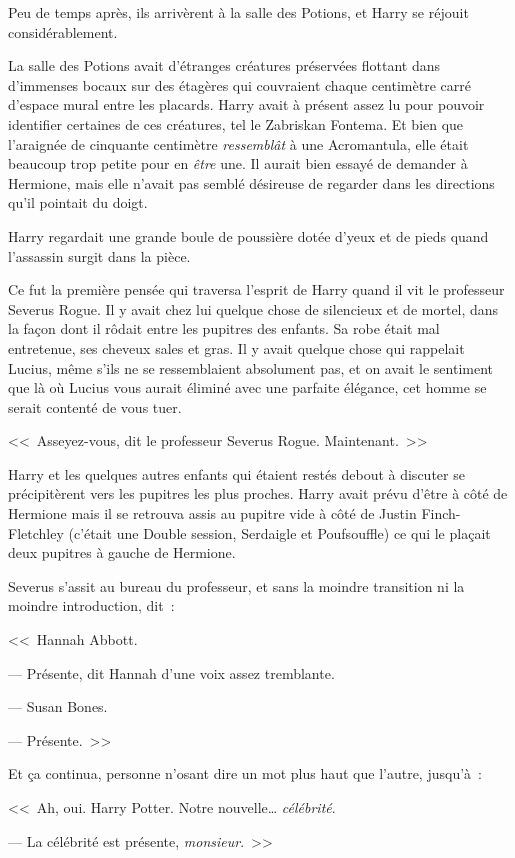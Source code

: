 Peu de temps après, ils arrivèrent à la salle des Potions, et Harry se réjouit considérablement.

La salle des Potions avait d'étranges créatures préservées flottant dans d'immenses bocaux sur des étagères qui couvraient chaque centimètre carré d'espace mural entre les placards. Harry avait à présent assez lu pour pouvoir identifier certaines de ces créatures, tel le Zabriskan Fontema. Et bien que l'araignée de cinquante centimètre \emph{ressemblât} à une Acromantula, elle était beaucoup trop petite pour en \emph{être} une. Il aurait bien essayé de demander à Hermione, mais elle n'avait pas semblé désireuse de regarder dans les directions qu'il pointait du doigt.

Harry regardait une grande boule de poussière dotée d'yeux et de pieds quand l'assassin surgit dans la pièce.

Ce fut la première pensée qui traversa l'esprit de Harry quand il vit le professeur Severus Rogue. Il y avait chez lui quelque chose de silencieux et de mortel, dans la façon dont il rôdait entre les pupitres des enfants. Sa robe était mal entretenue, ses cheveux sales et gras. Il y avait quelque chose qui rappelait Lucius, même s'ils ne se ressemblaient absolument pas, et on avait le sentiment que là où Lucius vous aurait éliminé avec une parfaite élégance, cet homme se serait contenté de vous tuer.

<<~Asseyez-vous, dit le professeur Severus Rogue. Maintenant.~>>

Harry et les quelques autres enfants qui étaient restés debout à discuter se précipitèrent vers les pupitres les plus proches. Harry avait prévu d'être à côté de Hermione mais il se retrouva assis au pupitre vide à côté de Justin Finch-Fletchley (c'était une Double session, Serdaigle et Poufsouffle) ce qui le plaçait deux pupitres à gauche de Hermione.

Severus s'assit au bureau du professeur, et sans la moindre transition ni la moindre introduction, dit~:

<<~Hannah Abbott.

--- Présente, dit Hannah d'une voix assez tremblante.

--- Susan Bones.

--- Présente.~>>

Et ça continua, personne n'osant dire un mot plus haut que l'autre, jusqu'à~:

<<~Ah, oui. Harry Potter. Notre nouvelle… \emph{célébrité}.

--- La célébrité est présente, \emph{monsieur}.~>>

